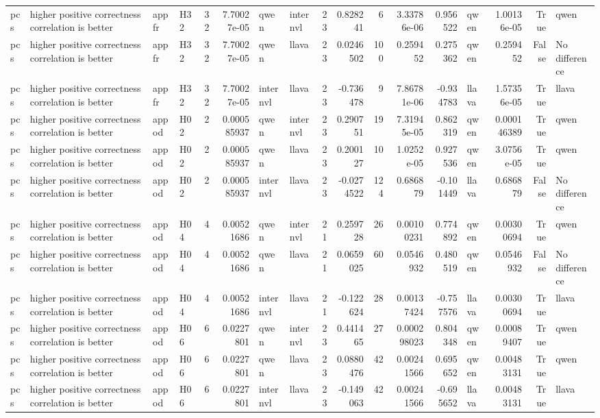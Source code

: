 \begin{longtable}{llllrrllrrrrrlrrl}
pcs & higher positive correctness correlation is better & appfr & H32 & 32 & 7.70027e-05 & qwen & internvl & 23 & 0.828241 & 6 & 3.33786e-06 & 0.956522 & qwen & 1.00136e-05 & True & qwen \\
pcs & higher positive correctness correlation is better & appfr & H32 & 32 & 7.70027e-05 & qwen & llava & 23 & 0.0246502 & 100 & 0.259452 & 0.275362 & qwen & 0.259452 & False & No difference \\
pcs & higher positive correctness correlation is better & appfr & H32 & 32 & 7.70027e-05 & internvl & llava & 23 & -0.736478 & 9 & 7.86781e-06 & -0.934783 & llava & 1.57356e-05 & True & llava \\
pcs & higher positive correctness correlation is better & appod & H02 & 2 & 0.000585937 & qwen & internvl & 23 & 0.290751 & 19 & 7.31945e-05 & 0.862319 & qwen & 0.000146389 & True & qwen \\
pcs & higher positive correctness correlation is better & appod & H02 & 2 & 0.000585937 & qwen & llava & 23 & 0.200127 & 10 & 1.0252e-05 & 0.927536 & qwen & 3.0756e-05 & True & qwen \\
pcs & higher positive correctness correlation is better & appod & H02 & 2 & 0.000585937 & internvl & llava & 23 & -0.0274522 & 124 & 0.686879 & -0.101449 & llava & 0.686879 & False & No difference \\
pcs & higher positive correctness correlation is better & appod & H04 & 4 & 0.00521686 & qwen & internvl & 21 & 0.259728 & 26 & 0.00100231 & 0.774892 & qwen & 0.00300694 & True & qwen \\
pcs & higher positive correctness correlation is better & appod & H04 & 4 & 0.00521686 & qwen & llava & 21 & 0.0659025 & 60 & 0.0546932 & 0.480519 & qwen & 0.0546932 & False & No difference \\
pcs & higher positive correctness correlation is better & appod & H04 & 4 & 0.00521686 & internvl & llava & 21 & -0.122624 & 28 & 0.00137424 & -0.757576 & llava & 0.00300694 & True & llava \\
pcs & higher positive correctness correlation is better & appod & H06 & 6 & 0.0227801 & qwen & internvl & 23 & 0.441465 & 27 & 0.000298023 & 0.804348 & qwen & 0.00089407 & True & qwen \\
pcs & higher positive correctness correlation is better & appod & H06 & 6 & 0.0227801 & qwen & llava & 23 & 0.0880476 & 42 & 0.00241566 & 0.695652 & qwen & 0.00483131 & True & qwen \\
pcs & higher positive correctness correlation is better & appod & H06 & 6 & 0.0227801 & internvl & llava & 23 & -0.149063 & 42 & 0.00241566 & -0.695652 & llava & 0.00483131 & True & llava \\

\end{longtable}
